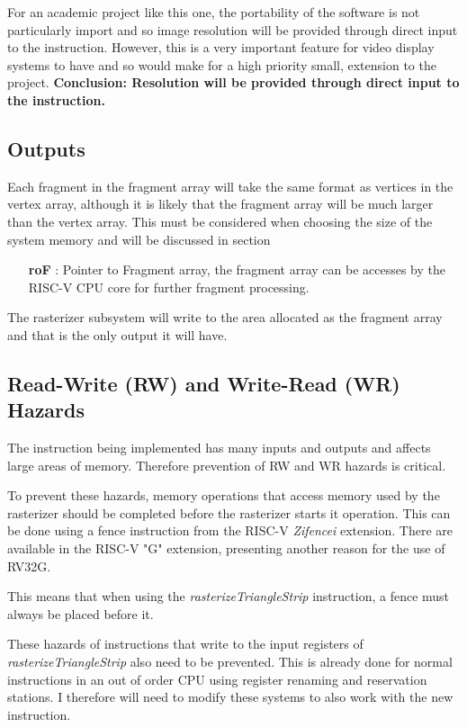 \begin{shaded}\label{decision:monitorResInput}
For an academic project like this one, the portability of the software is not particularly import and so image resolution will be provided through direct input to the instruction. However, this is a very important feature for video display systems to have and so would make for a high priority small, extension to the project.
\newline
\newline
\textbf{Conclusion: Resolution will be provided through direct input to the instruction.}
\end{shaded}

\subsection{Outputs}
Each fragment in the fragment array will take the same format as vertices in the vertex array, although it is likely that the fragment array will be much larger than the vertex array. This must be considered when choosing the size of the system memory and will be discussed in section 
\begin{itemize}
    \item[\textbf{roF}]: Pointer to Fragment array, the fragment array can be accesses by the RISC-V CPU core for further fragment processing.
\end{itemize}

The rasterizer subsystem will write to the area allocated as the fragment array and that is the only output it will have. 

\subsection{Read-Write (RW) and Write-Read (WR) Hazards}
The instruction being implemented has many inputs and outputs and affects large areas of memory. Therefore prevention of RW and WR hazards is critical.

To prevent these hazards, memory operations that access memory used by the rasterizer should be completed before the rasterizer starts it operation. This can be done using a fence instruction from the RISC-V \textit{Zifencei} extension\cite{RVISAManualVol1}. There are available in the RISC-V "G" extension, presenting another reason for the use of RV32G.

This means that when using the \textit{rasterizeTriangleStrip} instruction, a fence must always be placed before it. 

These hazards of instructions that write to the input registers of \textit{rasterizeTriangleStrip} also need to be prevented. This is already done for normal instructions in an out of order CPU using register renaming and reservation stations. I therefore will need to modify these systems to also work with the new instruction.
